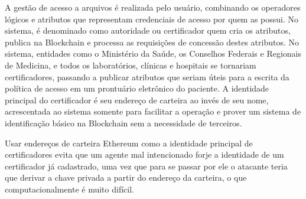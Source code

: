 \documentclass[a4paper,11pt]{article}
\begin{document}
A gestão de acesso a arquivos é realizada pelo usuário, combinando os operadores lógicos e atributos que representam credenciais de acesso por quem as possui.
No sistema, é denominado como autoridade ou certificador quem cria os atributos, publica na Blockchain e processa as requisições de concessão destes atributos.
No sistema, entidades como o Ministério da Saúde, os Conselhos Federais e Regionais de Medicina, e todos os laboratórios, clínicas e hospitais se tornariam certificadores, passando a publicar atributos que seriam úteis para a escrita da política de acesso em um prontuário eletrônico do paciente.
A identidade principal do certificador é seu endereço de carteira ao invés de seu nome, acrescentada ao sistema somente para facilitar a operação e prover um sistema de identificação básico na Blockchain sem a necessidade de terceiros.


Usar endereços de carteira Ethereum como a identidade principal de certificadores evita que um agente mal intencionado forje a identidade de um certificador já cadastrado, uma vez que para se passar por ele o atacante teria que derivar a chave privada a partir do endereço da carteira, o que computacionalmente é muito difícil.
\end{document}
